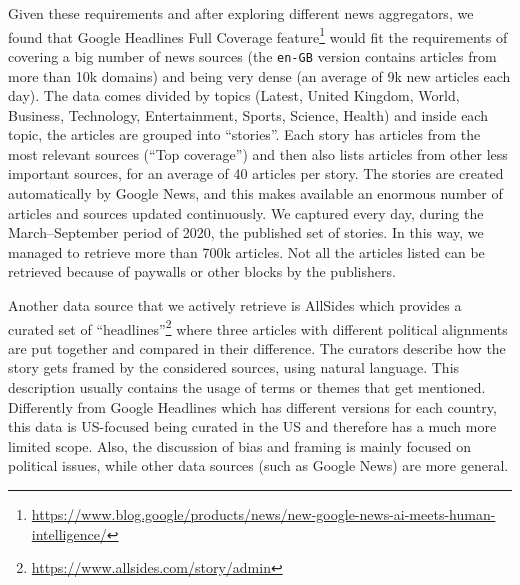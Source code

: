 Given these requirements and after exploring different news aggregators, we found that Google Headlines Full Coverage feature\footnote{\url{https://www.blog.google/products/news/new-google-news-ai-meets-human-intelligence/}} would fit the requirements of covering a big number of news sources (the \texttt{en-GB} version contains articles from more than 10k domains) and being very dense (an average of 9k new articles each day).
The data comes divided by topics (Latest, United Kingdom, World, Business, Technology, Entertainment, Sports, Science, Health) and inside each topic, the articles are grouped into ``stories''. Each story has articles from the most relevant sources (``Top coverage'') and then also lists articles from other less important sources, for an average of 40 articles per story.
The stories are created automatically by Google News, and this makes available an enormous number of articles and sources updated continuously. %
We captured every day, during the March–September period of 2020, the published set of stories. In this way, we managed to retrieve more than 700k articles. Not all the articles listed can be retrieved because of paywalls or other blocks by the publishers.

Another data source that we actively retrieve is AllSides which provides a curated set of ``headlines''\footnote{\url{https://www.allsides.com/story/admin}} where three articles with different political alignments are put together and compared in their difference.
The curators describe how the story gets framed by the considered sources, using natural language.
This description usually contains the usage of terms or themes that get mentioned.
Differently from Google Headlines which has different versions for each country, this data is US-focused being curated in the US and therefore has a much more limited scope. Also, the discussion of bias and framing is mainly focused on political issues, while other data sources (such as Google News) are more general. %

